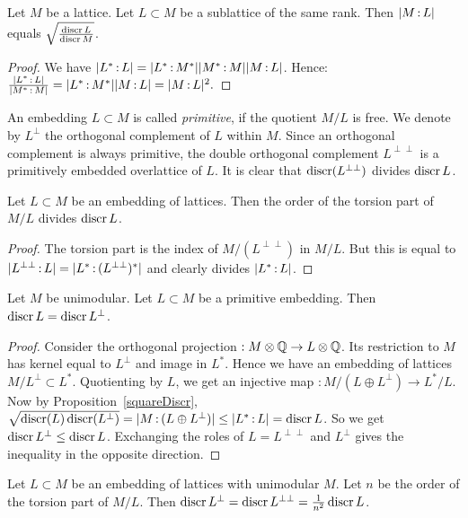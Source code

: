 \begin{proposition} \label{squareDiscr}Let $M$ be a lattice. Let $L\subset M$ be a sublattice of the same rank. Then $|M\,{:}\, L|$ equals $\sqrt{\frac{\operatorname{discr} L}{\operatorname{discr} M}}$.
\end{proposition}
\begin{proof}
We have $|L^*\,{:}\, L|=|L^*\,{:}\, M^*||M^*\,{:}\, M||M\,{:}\, L|$. Hence:
$\frac{|L^*\,{:}\, L|}{|M^*\,{:}\, M|}=|L^*\,{:}\, M^*||M\,{:}\, L|=|M\,{:}\, L|^2.$
\end{proof}
An embedding $L\subset M$ is called \emph{primitive}, if the quotient $M/L$ is free. We denote by $L^\perp$ the orthogonal complement of $L$ within $M$. Since an orthogonal complement is always primitive, the double orthogonal complement $ L^{\perp\perp}$ is a primitively embedded overlattice of $L$. It is clear that $\operatorname{discr}( L^{\perp\perp})$ divides $\operatorname{discr} L$. 
\begin{proposition}\label{TorsionQuotient} Let $L\subset M$ be an embedding of lattices. Then the order of the torsion part of $M/L$ 
divides $\operatorname{discr} L$.
\end{proposition}
\begin{proof}
The torsion part is the index of $M/( L^{\perp\perp})$ in $M/L$. But this is equal to $|L^{\perp\perp}\,{:}\, L| = |L^* \,{:}\, (L^{\perp\perp})^*|$ and clearly divides $|L^*\,{:}\, L|$.
\end{proof}
\begin{proposition}\label{discrOrthPrim}
Let $M$ be unimodular. Let $L\subset M$ be a primitive embedding. Then $\operatorname{discr} L = \operatorname{discr} L^\perp$.
\end{proposition}
\begin{proof}
Consider the orthogonal projection $ : M\otimes\mathbb{Q} \rightarrow L\otimes \mathbb{Q}$. Its restriction to $M$ has kernel equal to $L^\perp$ and image in $L^*$. Hence we have an embedding of lattices $M/L^\perp \subset L^*$. Quotienting by $L$, we get an injective map $: M/(L\oplus L^\perp) \rightarrow L^*/L$. 
Now by Proposition~\ref{squareDiscr}, $\sqrt{\operatorname{discr}(L) \operatorname{discr} (L^\perp)} =|M \,{:}\, (L\oplus L^\perp)| \leq |L^*\,{:}\, L| = \operatorname{discr} L$. So we get $\operatorname{discr} L^\perp \leq \operatorname{discr} L$. Exchanging the roles of $L=L^{\perp\perp}$ and $L^\perp$ gives the inequality in the opposite direction.
\end{proof}
\begin{corollary}\label{latticeCor}
Let $L\subset M$ be an embedding of lattices with unimodular $M$. Let $n$ be the order of the torsion part of $M/L$. Then $\operatorname{discr} L^\perp =\operatorname{discr} L^{\perp\perp} = \frac{1}{n^2}\operatorname{discr} L$.
\end{corollary}

